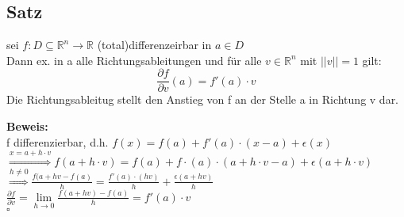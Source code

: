 \subsection{Satz}
sei $f: D\subseteq \mathbb{R}^n\rightarrow \mathbb{R}$ (total)differenzeirbar in $a\in D$\\
Dann ex. in a alle Richtungsableitungen und für alle $v\in\mathbb{R}^n$ mit $||v||=1$ gilt:
\[\frac{\partial f}{\partial v}(a)=f'(a)\cdot v\]
Die Richtungsableitug stellt den Anstieg von f an der Stelle a in Richtung v dar.

\textbf{Beweis:}\\
f differenzierbar, d.h. $f(x)=f(a)+f'(a)\cdot (x-a)+\epsilon(x)$\\
$\stackrel{x=a+h\cdot v}{\Rightarrow} f(a+h\cdot v)=f(a)+f\cdot (a)\cdot (a+h\cdot v-a)+\epsilon(a+h\cdot v)$\\
$\stackrel{h\neq 0}{\Rightarrow} \frac{f(a+hv-f(a)}{h}=\frac{f'(a)\cdot (hv)}{h} + \frac{\epsilon (a+hv)}{h}$\\
$\frac{\partial f}{\partial v}=\lim\limits_{h\rightarrow 0}\frac{f(a+hv)-f(a)}{h}=f'(a)\cdot v$\\
\hspace*{13cm}$\square$

